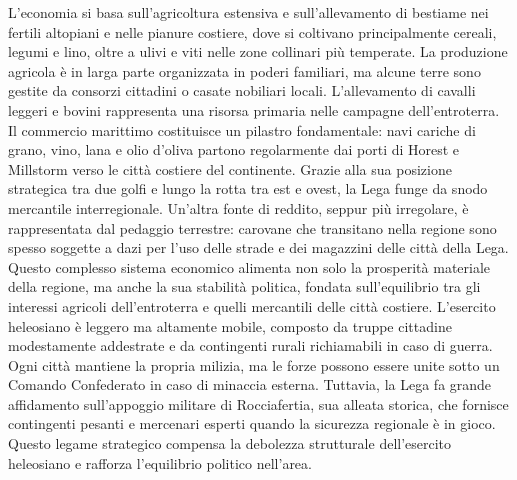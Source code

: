 \documentclass[10pt, a4paper]{report}
\begin{document}
\begin{multicols}{2}
L’economia si basa sull’agricoltura estensiva e sull’allevamento di bestiame nei fertili altopiani e nelle pianure costiere, dove si coltivano principalmente cereali, legumi e lino, oltre a ulivi e viti nelle zone collinari più temperate. La produzione agricola è in larga parte organizzata in poderi familiari, ma alcune terre sono gestite da consorzi cittadini o casate nobiliari locali. L’allevamento di cavalli leggeri e bovini rappresenta una risorsa primaria nelle campagne dell'entroterra.
Il commercio marittimo costituisce un pilastro fondamentale: navi cariche di grano, vino, lana e olio d'oliva partono regolarmente dai porti di Horest e Millstorm verso le città costiere del continente. Grazie alla sua posizione strategica tra due golfi e lungo la rotta tra est e ovest, la Lega funge da snodo mercantile interregionale.
Un’altra fonte di reddito, seppur più irregolare, è rappresentata dal pedaggio terrestre: carovane che transitano nella regione sono spesso soggette a dazi per l’uso delle strade e dei magazzini delle città della Lega.
Questo complesso sistema economico alimenta non solo la prosperità materiale della regione, ma anche la sua stabilità politica, fondata sull’equilibrio tra gli interessi agricoli dell’entroterra e quelli mercantili delle città costiere.
L’esercito heleosiano è leggero ma altamente mobile, composto da truppe cittadine modestamente addestrate e da contingenti rurali richiamabili in caso di guerra. Ogni città mantiene la propria milizia, ma le forze possono essere unite sotto un Comando Confederato in caso di minaccia esterna. Tuttavia, la Lega fa grande affidamento sull’appoggio militare di Rocciafertia, sua alleata storica, che fornisce contingenti pesanti e mercenari esperti quando la sicurezza regionale è in gioco. Questo legame strategico compensa la debolezza strutturale dell’esercito heleosiano e rafforza l’equilibrio politico nell’area.



\end{multicols}
\end{document}
